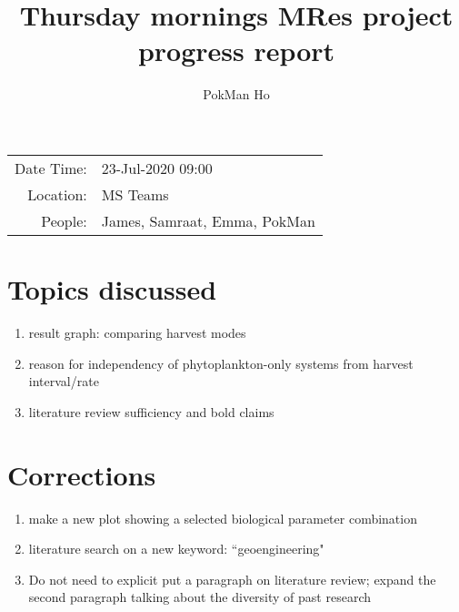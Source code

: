 \documentclass[a4paper,11pt]{article}
\title{Thursday mornings MRes project progress report}
\author{PokMan Ho}
\date{}
\begin{document}
    \maketitle
    
    \begin{tabular}{rl}
        Date Time: & 23-Jul-2020 09:00 \\
        Location: & MS Teams \\
        People: & James, Samraat, Emma, PokMan \\
    \end{tabular}
    
    \section{Topics discussed}
    \begin{enumerate}
        \item result graph: comparing harvest modes
        \item reason for independency of phytoplankton-only systems from harvest interval/rate
        \item literature review sufficiency and bold claims
    \end{enumerate}
    
    \section{Corrections}
    \begin{enumerate}
        \item make a new plot showing a selected biological parameter combination
        \item literature search on a new keyword: ``geoengineering"
        \item Do not need to explicit put a paragraph on literature review; expand the second paragraph talking about the diversity of past research
    \end{enumerate}
    
\end{document}
